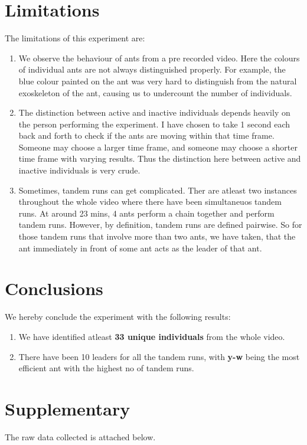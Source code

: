 \documentclass{scrartcl}
\begin{document}
\section{Limitations}
The limitations of this experiment are:
\begin{enumerate}
  \item We observe the behaviour of ants from a pre recorded video. Here the colours of individual ants are 
      not always distinguished properly. For example, the blue colour painted on the ant was very hard to distinguish from the 
      natural exoskeleton of the ant, causing us to undercount the number of individuals.
      \item The distinction between active and inactive individuals depends heavily on the person performing the experiment.
           I have chosen to take 1 second each back and forth to check if the ants are moving within that time frame. 
           Someone may choose a larger time frame, and someone may choose a shorter time frame with varying results.
           Thus the distinction here between active and inactive individuals is very crude.
           \item Sometimes, tandem runs can get complicated. Ther are atleast two instances throughout the 
               whole video where there have been simultaneuos tandem runs. At around 23 mins, 4 ants perform a chain together and perform tandem runs. 
               However, by definition, tandem runs are defined pairwise. So for those tandem runs that involve more than two ants, we have taken, that the ant 
               immediately in front of some ant acts as the leader of that ant.
\end{enumerate}
\section{Conclusions}
We hereby conclude the experiment with the following results:
\begin{enumerate}
    \item We have identified atleast \textbf{33 unique individuals} from the whole video.
    \item  There have been 10 leaders for all the tandem runs, with \textbf{y-w} being the most efficient ant with the highest no of tandem runs. 
\end{enumerate}
\section{Supplementary}
The raw data collected is attached below.
\end{document}
